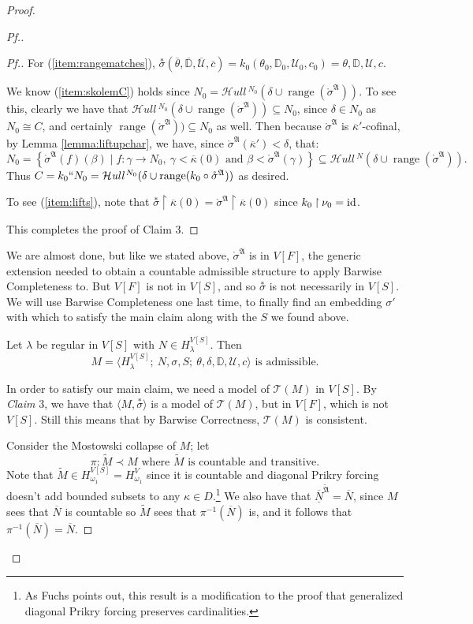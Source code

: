 \documentclass{amsart}
\theoremstyle{definition}
\theoremstyle{remark}
\newcommand{\D}{\mathbb{D}}
\newcommand{\N}{{\overline{N}}}
\newcommand{\U}{\mathcal{U}}
\newcommand{\id}{\textup{\ensuremath{\text{id}}}}
\DeclareMathOperator{\ran}{range}
\newcommand{\st}{\; | \;}
\newcommand{\set}[2]{\left\{#1\st #2 \right\}}
\newcommand{\rest}{\mathbin{\upharpoonright}}
\newcommand{\SH}{\mathcal{H}\textit{ull} \,}
\newcommand{\sk}[3]{\SH^{#1}( {#2} \cup {\ran(#3)} ) }
\begin{document}
\begin{proof}
\begin{proof}[Pf.]
\begin{proof}[Pf.]
For (\ref{item:rangematches}), $\overset{*} {\sigma}(\overline \theta, \overline{\D}, \overline{\U}, \overline c)= k_0(\theta_0, \D_0, \U_0, c_0) =\theta, \D, \U, c$.

We know (\ref{item:skolemC}) holds since $N_0 = \sk{N_0}{\delta}{\mathring \sigma^{\mathfrak A}}$. To see this, clearly we have that $\sk{N_0}{\delta}{\mathring \sigma^{\mathfrak A}} \subseteq N_0$, since $\delta \in N_0$ as $N_0 \cong C$, and certainly $\ran(\mathring \sigma^{\mathfrak A})) \subseteq N_0$ as well. Then because $\mathring \sigma^{\mathfrak A}$ is $\overline \kappa'$-cofinal, by Lemma \ref{lemma:liftupchar}, we have, since $\mathring \sigma^{\mathfrak A}(\overline \kappa') < \delta$, that:
$$N_0 = \set{\mathring \sigma^{\mathfrak A}(f)(\beta)}{ f: \gamma \longrightarrow N_0, \ \gamma < \overline \kappa(0) \text{ and } \beta < \mathring \sigma^{\mathfrak A}(\gamma) } \subseteq \sk{N}{\delta}{\mathring \sigma^{\mathfrak A}}.$$
Thus $C = k_0``N_0=\sk{N_0}{\delta}{k_0 \circ \mathring \sigma^{\mathfrak A}}$ as desired. 

To see (\ref{item:lifts}), note that $\overset{*} {\sigma} \rest \overline \kappa(0) = \mathring{\sigma}^{\mathfrak A} \rest \overline \kappa(0)$ since $k_0 \rest \nu_0 = \id$.

This completes the proof of Claim 3.
\end{proof}

We are almost done, but like we stated above, $\mathring{\sigma}^{\mathfrak A}$ is in $V[F]$, the generic extension needed to obtain a countable admissible structure to apply Barwise Completeness to. But $V[F]$ is not in $V[S]$, and so $\overset{*} {\sigma}$ is not necessarily in $V[S]$. We will use Barwise Completeness one last time, to finally find an embedding $\sigma'$ with which to satisfy the main claim along with the $S$ we found above.

Let $\lambda$ be regular in $V[S]$ with $N \in H_\lambda^{V[S]}$. Then 
	$$M = \langle H^{V[S]}_\lambda;\ N, \sigma, S;\ \theta, \delta, \D, \U, c \rangle \text{ is admissible.}$$

In order to satisfy our main claim, we need a model of $\mathcal T(M)$ in $V[S]$. By \textit{Claim} 3, we have that $\langle M , \overset{*} {\sigma}\rangle$ is a model of $\mathcal T(M)$, but in $V[F]$, which is not $V[S]$. Still this means that by Barwise Correctness, $\mathcal T(M)$ is consistent.
 
Consider the Mostowski collapse of $M$; let 
	$$\pi: \tilde M \prec M \text{ where $\tilde M$ is countable and transitive.}$$
Note that $\tilde M \in H_{\omega_1}^{V[S]}=H_{\omega_1}^V$ since it is countable and diagonal Prikry forcing doesn't add bounded subsets to any $\kappa \in D$.\footnote{As Fuchs \cite{Fuchs:2005kx} points out, this result is a modification to the proof that generalized diagonal Prikry forcing preserves cardinalities.} We also have that $\overline{\underline N}^{\tilde{\mathfrak A}} = \N$, since $M$ sees that $\N$ is countable so $\tilde{M}$ sees that $\pi^{-1}(\N)$ is, and it follows that $\pi^{-1}(\N)=\N$.


\end{proof}
\end{proof}
\end{document}

